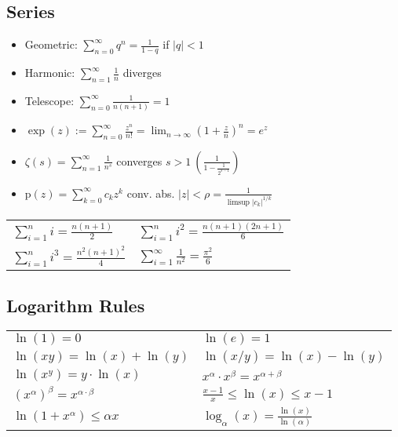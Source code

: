 \subsection{Series}
\begin{itemize}
  \item Geometric: $\sum_{n = 0}^\infty q^n = \frac{1}{1 - q}$ if $|q| < 1$
  \item Harmonic: $\sum_{n = 1}^\infty \frac{1}{n}$ diverges
  \item Telescope: $\sum_{n = 0}^\infty \frac{1}{n(n + 1)} = 1$
  \item $\exp(z) := \sum_{n = 0}^\infty \frac{z^n}{n!} = \lim_{n\to\infty}(1 + \frac{z}{n})^n = e^z$
  \item $\zeta(s) = \sum_{n=1}^\infty \frac{1}{n^s}$ converges $s > 1 \ (\frac{1}{1 - \frac{1}{2^{s-1}}})$
  \item $\text{p}(z) = \sum_{k = 0}^\infty c_kz^k$ conv. abs. $|z| < \rho = \frac{1}{\limsup |c_k|^{1/k}}$
\end{itemize}
\begin{tabularx}{\linewidth}{XX}
  \toprule
  $\sum\limits_{i=1}^n i = \frac{n(n+1)}{2}$ & $\sum\limits_{i=1}^n i^2 = \frac{n(n+1)(2n + 1)}{6}$ \\
  $\sum\limits_{i=1}^n i^3 = \frac{n^2(n+1)^2}{4}$ & $\sum\limits_{i=1}^\infty \frac{1}{n^2} = \frac{\pi^2}{6}$ \\
  \bottomrule
\end{tabularx}

\subsection{Logarithm Rules}
\renewcommand{\arraystretch}{1}
\begin{tabularx}{\linewidth}{XX}
  $\ln(1) = 0$ & $\ln(e) = 1$ \\
  $\ln(xy) = \ln(x) + \ln(y)$ & $\ln(x/y) = \ln(x) - \ln(y)$ \\
  $\ln(x^y) = y \cdot \ln(x)$ & $x^\alpha \cdot x^\beta = x^{\alpha + \beta}$ \\
  $(x^\alpha)^\beta = x^{\alpha \cdot \beta}$ & $\frac{x - 1}{x} \leq \ln(x) \leq x - 1$ \\
  $\ln(1 + x^\alpha) \leq \alpha x$ & $\log_\alpha(x) = \frac{\ln(x)}{\ln(\alpha)}$
\end{tabularx}

